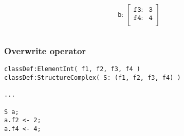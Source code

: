 \documentclass[11pt]{beamer}
\begin{document}
\begin{frame}[fragile]
\begin{columns}
\begin{column}{0.5\textwidth}
\begin{center}
		\end{center}
	\end{column}
	\begin{column}{0.5\textwidth}
		\begin{center}
			\texttt{b}: $\begin{bmatrix}
																				\texttt{f3:}      & \texttt{3}\\ 
																				\texttt{f4:}     	& \texttt{4}\\ 
																			\end{bmatrix}$
		\end{center}
	\end{column}
\end{columns}
\end{frame}


\begin{frame}[fragile]
\frametitle{Overwrite operator}
\scriptsize
\begin{lstlisting}[language=lekta]
classDef:ElementInt( f1, f2, f3, f4 )
classDef:StructureComplex( S: (f1, f2, f3, f4) )

...

S a;
a.f2 <- 2;
a.f4 <- 4;


\end{lstlisting}
\end{frame}
\end{document}
